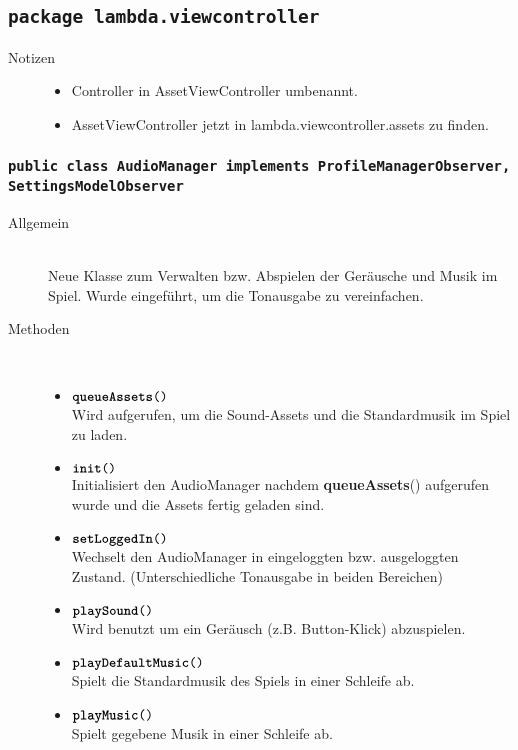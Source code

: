 \subsection{\texttt{package lambda.viewcontroller}}

\begin{description}
	\item[Notizen] \hfill
	\begin{itemize}
		\item Controller in AssetViewController umbenannt.
		\item AssetViewController jetzt in lambda.viewcontroller.assets zu finden.
	\end{itemize}
\end{description}

\subsubsection{\normalfont \texttt{public class \textbf{AudioManager} implements ProfileManagerObserver, SettingsModelObserver}}

\begin{description}
\item[Allgemein] \hfill \\ Neue Klasse zum Verwalten bzw. Abspielen der Geräusche und Musik im Spiel. Wurde eingeführt, um die Tonausgabe zu vereinfachen.
	
\item[Methoden] \hfill \\
	\vspace{-.8cm}
	\begin{itemize}
		\item $\texttt{\textbf{queueAssets}()}$ \\ Wird aufgerufen, um die Sound-Assets und die Standardmusik im Spiel zu laden.
		
		\item $\texttt{\textbf{init}()}$ \\ Initialisiert den AudioManager nachdem \textbf{queueAssets}() aufgerufen wurde und die Assets fertig geladen sind.
				
		\item $\texttt{\textbf{setLoggedIn}()}$ \\ Wechselt den AudioManager in eingeloggten bzw. ausgeloggten Zustand. (Unterschiedliche Tonausgabe in beiden Bereichen)
		
		\item $\texttt{\textbf{playSound}()}$ \\ Wird benutzt um ein Geräusch (z.B. Button-Klick) abzuspielen.
	
		\item $\texttt{\textbf{playDefaultMusic}()}$ \\ Spielt die Standardmusik des Spiels in einer Schleife ab.
	
		\item $\texttt{\textbf{playMusic}()}$ \\ Spielt gegebene Musik in einer Schleife ab.
	\end{itemize}
\end{description}

